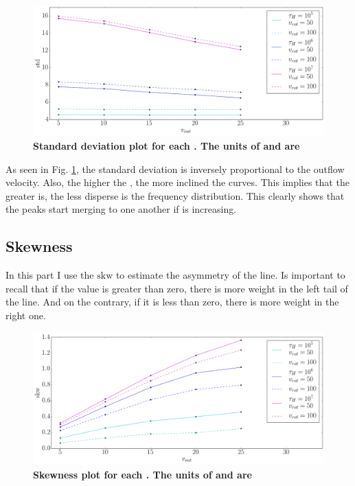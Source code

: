 \begin{figure}[h!]
	\begin{center}
		\includegraphics[width=1\textwidth]{./figures/chapter3/std}
	\end{center}
	\caption{\textbf{Standard deviation plot for each \tauh. The units of \vrot and \vout are \kms}
	\label{fig:std}}
\end{figure}

As seen in Fig. \ref{fig:std}, the standard deviation is inversely proportional to the outflow velocity. Also, the higher the \tauh, the more inclined the curves. This implies that the greater \vout is, the less disperse is the \lya frequency distribution. This clearly shows that the peaks start merging to one another if \vout is increasing.\\

\subsection{Skewness}
In this part I use the $\mathrm{skw}$ to estimate the asymmetry of the \lya line. Is important to recall that if the value is greater than zero, there is more weight in the left tail of the line. And on the contrary, if it is less than zero, there is more weight in the right one.\\

\begin{figure}[h!]
	\begin{center}
		\includegraphics[width=1\textwidth]{./figures/chapter3/skw}
	\end{center}
	\caption{\textbf{Skewness plot for each \tauh. The units of \vrot and \vout are \kms} 
		\label{fig:skw}}
\end{figure}

